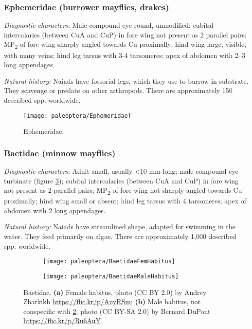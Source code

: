 \subsubsection{Ephemeridae (burrower mayflies, drakes)}
\noindent{}\textit{Diagnostic characters:} Male compound eye round, unmodified; cubital intercalaries (between CuA and CuP) in fore wing not present as 2 parallel pairs; \texorpdfstring{MP\textsubscript{2}}{ }{ }of fore wing sharply angled towards Cu proximally; hind wing large, visible, with many veins; hind leg tarsus with 3-4 tarsomeres; apex of abdomen with 2--3 long appendages.\vspace{3mm}

\noindent{}\textit{Natural history:} Naiads have fossorial legs, which they use to burrow in substrate. They scavenge or predate on other arthropods. There are approximately 150 described spp. worldwide.\vspace{3mm}

\begin{figure}[ht!]
    \centering
       \texttt{[image: paleoptera/Ephemeridae]}
    \caption{Ephemeridae. \citep[modified from][Plate LXXV]{bhlitem81095ephem}}\label{fig:ephemerid}
\end{figure}

\subsubsection{Baetidae (minnow mayflies)}
\noindent{}\textit{Diagnostic characters:} Adult small, usually \textless10 mm long; male compound eye turbinate (figure \ref{fig:baetid2}); cubital intercalaries (between CuA and CuP) in fore wing not present as 2 parallel pairs; \texorpdfstring{MP\textsubscript{2}}{ }{ }of fore wing not sharply angled towards Cu proximally; hind wing small or absent; hind leg tarsus with 4 tarsomeres; apex of abdomen with 2 long appendages.\vspace{3mm}

\noindent{}\textit{Natural history:} Naiads have streamlined shape, adapted for swimming in the water. They feed primarily on algae. There are approximately 1,000 described spp. worldwide.\vspace{3mm}

\begin{figure}[ht!]
    \centering
    \begin{subfigure}[ht!]{0.42\textwidth}
        \texttt{[image: paleoptera/BaetidaeFemHabitus]}
        \caption{}
        \label{fig:baetid1}
    \end{subfigure}
    \hfill
    \begin{subfigure}[ht!]{0.45\textwidth}
        \texttt{[image: paleoptera/BaetidaeMaleHabitus]}
        \caption{}
        \label{fig:baetid2}
    \end{subfigure}
    \caption{Baetidae. \textbf{(a)} Female habitus, photo (CC BY 2.0) by Andrey Zharkikh \url{https://flic.kr/p/AnyRSm}; \textbf{(b)} Male habitus, not conspecific with \ref{fig:baetid1}, photo (CC BY-SA 2.0) by Bernard DuPont \url{https://flic.kr/p/Ru6AuY}}\label{fig:baetids}
\end{figure}

